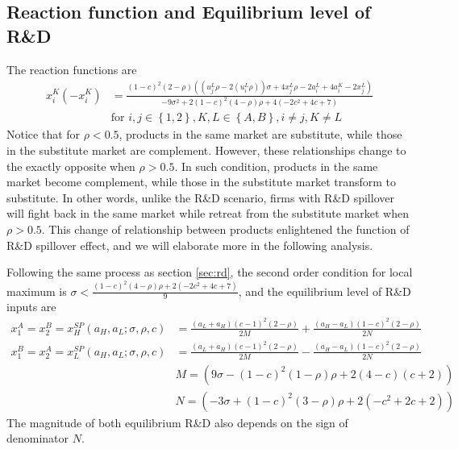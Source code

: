 \documentclass[12pt]{article}
\begin{document}
\subsection{Reaction function and Equilibrium level of R\&D}
\label{ssec:spillover_equi}
The reaction functions are
\begin{equation}
    \begin{aligned}
        x_i^K \left( -x_i^K \right)& = \frac{(1 - c)^2  (2 - \rho)  ((u_j^L \rho - 2 (u_i^L \rho)) \sigma + 4 x_j^L \rho - 2 a_i^L + 4 a_i^K - 2 x_j^L)}{- 9 \sigma^2 + 2 (1 - c)^2  (4 - \rho) \rho + 4 (- 2 c^2 + 4 c + 7)} \\
        & \text{for } i, j \in \left\{ 1, 2 \right\}, K, L \in \left\{ A, B \right\}, i \neq j, K \neq L
    \end{aligned}
    \label{eq:spillover_reaction}
\end{equation}
Notice that for $\rho < 0.5$, products in the same market are substitute, while those in the substitute market are complement.
However, these relationships change to the exactly opposite when $\rho > 0.5$.
In such condition, products in the same market become complement, while those in the substitute market transform to substitute.
In other words, unlike the R\&D scenario, firms with R\&D spillover will fight back in the same market while retreat from the substitute market when $\rho > 0.5$.
This change of relationship between products enlightened the function of R\&D spillover effect, and we will elaborate more in the following analysis.

Following the same process as section \ref{sec:rd}, the second order condition for local maximum is $\sigma < \frac{(1 - c)^2  (4 - \rho) \rho + 2 (- 2 c^2 + 4 c + 7)}{9}$, and the equilibrium level of R\&D inputs are
\begin{equation}
    \begin{aligned} 
        x_1^A = x_2^B = x_H^{SP} (a_H, a_L ; \sigma, \rho, c) & = \frac{(a_L + a_H)  (c - 1)^2  (2 - \rho)}{2 M} + \frac{(a_H - a_L)  (1 - c)^2  (2 - \rho)}{2 N}\\
        x_1^B = x_2^A = x_L^{SP} (a_H, a_L ; \sigma, \rho, c) & = \frac{(a_L + a_H)  (c - 1)^2  (2 - \rho)}{2 M} - \frac{(a_H - a_L)  (1 - c)^2  (2 - \rho)}{2 N}\\
        & M = (9 \sigma - (1 - c)^2  (1 - \rho) \rho + 2 (4 - c)  (c + 2))\\
        & N = (- 3 \sigma + (1 - c)^2  (3 - \rho) \rho + 2 (- c^2 + 2 c + 2))
    \end{aligned}
    \label{eq:spillover_equi_rd}
\end{equation}
The magnitude of both equilibrium R\&D also depends on the sign of denominator $N$.
\end{document}
